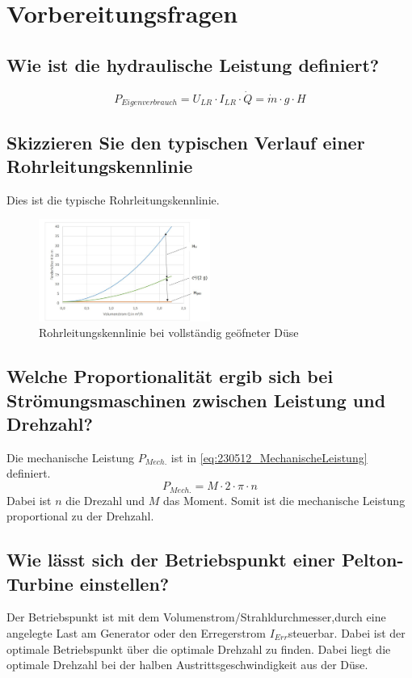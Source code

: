 \section{Vorbereitungsfragen}
\label{sec:Vorbereitungsfragen}
\subsection{Wie ist die hydraulische Leistung definiert?}
%
\begin{equation}
	P_{ Eigenverbrauch }= U_{ LR} \cdot I_{ LR }\cdot \dot Q = \dot m \cdot g \cdot H
\label{eq:2}
\end{equation}
%
\subsection{Skizzieren Sie den typischen Verlauf einer Rohrleitungskennlinie}
Dies ist die typische Rohrleitungskennlinie.
%
\begin{figure}[!ht]
		\centering
		\includegraphics[width=0.5\textwidth]{Abbildungen/Rohrleitungskennlinie}
		\caption{Rohrleitungskennlinie bei vollständig geöfneter Düse}
		\label{fig:230512_Rohrleitungskennlinie}
\end{figure}
%
\subsection{Welche Proportionalität ergib sich bei Strömungsmaschinen zwischen Leistung und Drehzahl?}
\label{subsec:P_mech-n}
Die mechanische Leistung $P_{Mech.}$ ist in \autoref{eq:230512_MechanischeLeistung} definiert.
%
\begin{equation}
	P_{Mech.}= M \cdot 2 \cdot \pi \cdot n
\label{eq:230512_MechanischeLeistung}
\end{equation}
%
Dabei ist $n$ die Drezahl und $M$ das Moment. Somit ist die mechanische Leistung proportional zu der Drehzahl.
\subsection{Wie lässt sich der Betriebspunkt einer Pelton-Turbine einstellen?}
Der Betriebspunkt ist mit dem Volumenstrom/Strahldurchmesser,durch eine angelegte Last am Generator oder den Erregerstrom $I_{Err}$steuerbar. Dabei ist der optimale Betriebspunkt über die optimale Drehzahl zu finden. Dabei liegt die optimale Drehzahl bei der halben Austrittsgeschwindigkeit aus der Düse.

